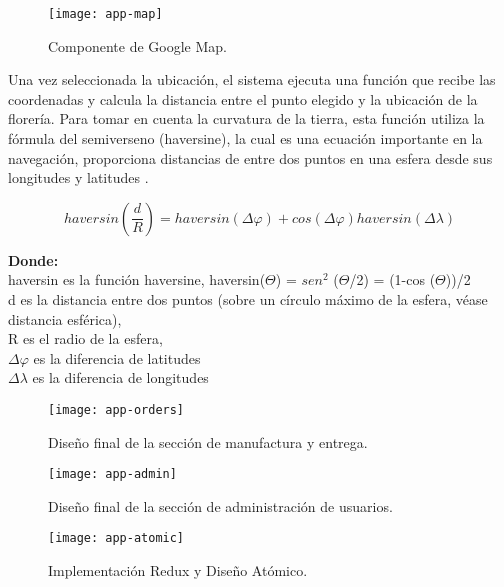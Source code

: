 \begin{figure}[H]
  \centering
  \texttt{[image: app-map]}
  \caption{Componente de Google Map.}
\end{figure}

Una vez seleccionada la ubicación, el sistema ejecuta una función que recibe las coordenadas y calcula la distancia entre el punto elegido y la ubicación de la florería. Para tomar en cuenta la curvatura de la tierra, esta función utiliza la fórmula del semiverseno (haversine), la cual es una ecuación importante en la navegación, proporciona distancias de entre dos puntos en una esfera desde sus longitudes y latitudes \cite{anisya}.

\[ 
  haversin\left(\frac{d}{R}\right) = haversin(\Delta\varphi) + cos(\Delta\varphi)haversin(\Delta\lambda)
\]

\textbf{Donde:}\\
\-\hspace{0.5cm} haversin es la función haversine, haversin($\Theta$) = $sen^2$ ($\Theta$/2) = (1-cos ($\Theta$))/2\\
\-\hspace{0.5cm} d es la distancia entre dos puntos (sobre un círculo máximo de la esfera, véase distancia esférica),\\
\-\hspace{0.5cm} R es el radio de la esfera,\\
\-\hspace{0.5cm} $\Delta\varphi$ es la diferencia de latitudes\\
\-\hspace{0.5cm} $\Delta\lambda$ es la diferencia de longitudes
\vspace{0.8cm}



\begin{figure}[H]
  \centering
  \texttt{[image: app-orders]}
  \caption{Diseño final de la sección de manufactura y entrega.}
\end{figure}
\vspace{0.8cm}

\begin{figure}[H]
  \centering
  \texttt{[image: app-admin]}
  \caption{Diseño final de la sección de administración de usuarios.}
\end{figure}
\vspace{0.8cm}

\begin{figure}[H]
  \centering
  \texttt{[image: app-atomic]}
  \caption{Implementación Redux y Diseño Atómico.}
\end{figure}
\vspace{0.8cm}